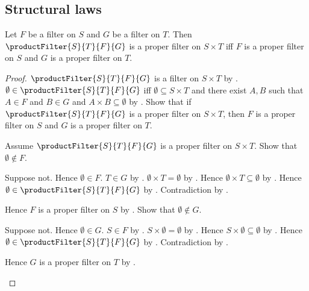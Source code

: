 \subsection{Structural laws}

\begin{theorem}\label{product_filter_is_proper_iff}
    Let $F$ be a filter on $S$ and $G$ be a filter on $T$.
    Then $\productFilter{S}{T}{F}{G}$ is a proper filter on $S\times T$
        iff $F$ is a proper filter on $S$ and
        $G$ is a proper filter on $T$.
\end{theorem}
\begin{proof}
    $\productFilter{S}{T}{F}{G}$ is a filter on $S\times T$ by
        .
    $\emptyset\in\productFilter{S}{T}{F}{G}$ iff
        $\emptyset\subseteq S\times T$ and there exist $A,B$ such that
        $A\in F$ and $B\in G$ and $A\times B\subseteq\emptyset$ by
        .
    Show that if $\productFilter{S}{T}{F}{G}$ is a proper filter on
        $S\times T$, then $F$ is a proper filter on $S$ and
        $G$ is a proper filter on $T$.
    \begin{subproof}
        Assume $\productFilter{S}{T}{F}{G}$ is a proper filter on
            $S\times T$.
        Show that $\emptyset\notin F$.
        \begin{subproof}
            Suppose not.
            Hence $\emptyset\in F$.
            $T\in G$ by .
            $\emptyset\times T=\emptyset$ by .
            Hence $\emptyset\times T\subseteq\emptyset$ by
                .
            Hence $\emptyset\in\productFilter{S}{T}{F}{G}$ by
                .
            Contradiction by .
        \end{subproof}
        Hence $F$ is a proper filter on $S$ by .
        Show that $\emptyset\notin G$.
        \begin{subproof}
            Suppose not.
            Hence $\emptyset\in G$.
            $S\in F$ by .
            $S\times\emptyset=\emptyset$ by .
            Hence $S\times\emptyset\subseteq\emptyset$ by
                .
            Hence $\emptyset\in\productFilter{S}{T}{F}{G}$ by
                .
            Contradiction by .
        \end{subproof}
        Hence $G$ is a proper filter on $T$ by .
    \end{subproof}

\end{proof}
